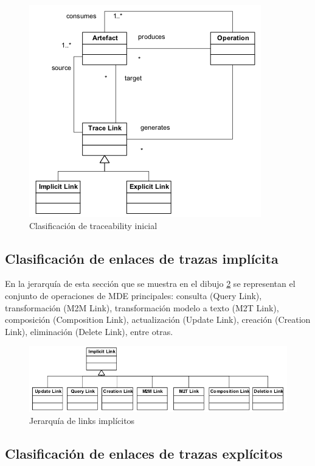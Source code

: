 \documentclass[a4paper,12pt,oneside]{book}
\begin{document}
\begin{figure}[hbtp]
\centering
\includegraphics[scale=0.75]{./img/ExplicitImplicitTraceLinkClassification}
\caption{Clasificación de traceability inicial}
\label{fig:ClasifInicial}
\end{figure}

\subsection{Clasificación de enlaces de trazas implícita}

En la jerarquía de esta sección que se muestra en el dibujo \ref{fig:LinksImplicitos} se representan el conjunto de operaciones de MDE principales: consulta (Query Link), transformación (M2M Link), transformación modelo a texto (M2T Link), composición (Composition Link), actualización (Update Link), creación (Creation Link), eliminación (Delete Link), entre otras.


\begin{figure}[hbtp]
\centering
\includegraphics[scale=0.55]{./img/ImplicitTraceLinks}
\caption{Jerarquía de links implícitos}
\label{fig:LinksImplicitos}
\end{figure}


\subsection{Clasificación de enlaces de trazas explícitos}
\end{document}
